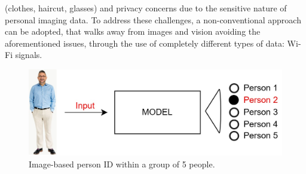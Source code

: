 \documentclass[binding=0.7cm, oneside]{sapthesis}
\begin{document}
(clothes, haircut, glasses) and privacy concerns due to the sensitive nature of personal imaging data. To address these challenges,
a non-conventional approach can be adopted, that walks away from images and vision avoiding the aforementioned issues, through the use of
completely different types of data: Wi-Fi signals.
\begin{figure}[h!]
    \centering
    \includegraphics[scale=0.3]{images/Person_id.jpg}
    \caption{Image-based person ID within a group of 5 people.}
    \label{fig:visionID}
\end{figure}
\end{document}
